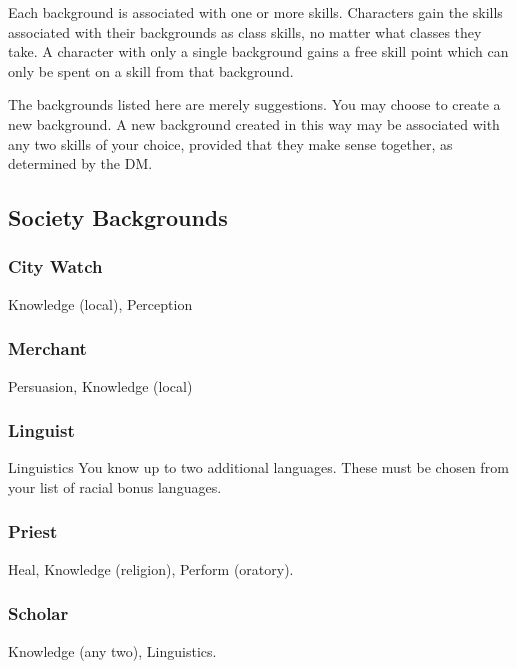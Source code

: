 Each background is associated with one or more skills. Characters gain the skills associated with their backgrounds as class skills, no matter what classes they take. A character with only a single background gains a free skill point which can only be spent on a skill from that background.

The backgrounds listed here are merely suggestions. You may choose to create a new background. A new background created in this way may be associated with any two skills of your choice, provided that they make sense together, as determined by the DM.


\subsection{Society Backgrounds}

\subsubsection{City Watch}
 Knowledge (local), Perception

\subsubsection{Merchant}
 Persuasion, Knowledge (local)

\subsubsection{Linguist}
 Linguistics
 You know up to two additional languages. These must be chosen from your list of racial bonus languages.

\subsubsection{Priest}
 Heal, Knowledge (religion), Perform (oratory).

\subsubsection{Scholar}
 Knowledge (any two), Linguistics.

